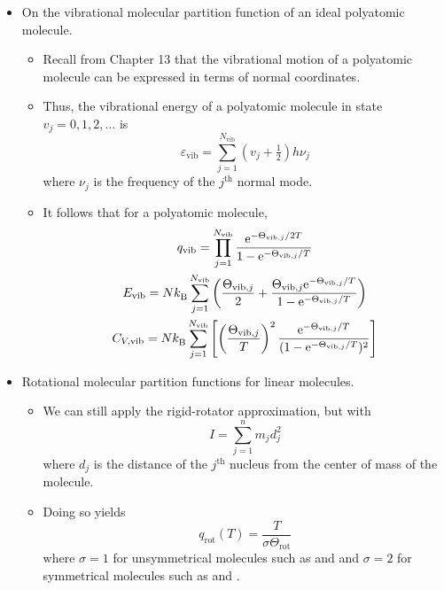 \documentclass[../notes.tex]{subfiles}
\begin{document}
\begin{itemize}
    \item On the vibrational molecular partition function of an ideal polyatomic molecule.
    \begin{itemize}
        \item Recall from Chapter 13 that the vibrational motion of a polyatomic molecule can be expressed in terms of normal coordinates.
        \item Thus, the vibrational energy of a polyatomic molecule in state $v_j=0,1,2,\dots$ is
        \begin{equation*}
            \varepsilon_\text{vib} = \sum_{j=1}^{N_\text{vib}}\left( v_j+\tfrac{1}{2} \right)h\nu_j
        \end{equation*}
        where $\nu_j$ is the frequency of the $j^\text{th}$ normal mode.
        \item It follows that for a polyatomic molecule,
        \begin{gather*}
            q_\text{vib} = \prod_{j=1}^{N_\text{vib}}\frac{\e[-\Theta_{\text{vib},j}/2T]}{1-\e[-\Theta_{\text{vib},j}/T]}\\
            E_\text{vib} = N\kB\sum_{j=1}^{N_\text{vib}}\left( \frac{\Theta_{\text{vib},j}}{2}+\frac{\Theta_{\text{vib},j}\e[-\Theta_{\text{vib},j}/T]}{1-\e[-\Theta_{\text{vib},j}/T]} \right)\\
            C_{V,\text{vib}} = N\kB\sum_{j=1}^{N_\text{vib}}\left[ \left( \frac{\Theta_{\text{vib},j}}{T} \right)^2\frac{\e[-\Theta_{\text{vib},j}/T]}{(1-\e[-\Theta_{\text{vib},j}/T])^2} \right]
        \end{gather*}
    \end{itemize}
    \item Rotational molecular partition functions for linear molecules.
    \begin{itemize}
        \item We can still apply the rigid-rotator approximation, but with
        \begin{equation*}
            I = \sum_{j=1}^nm_jd_j^2
        \end{equation*}
        where $d_j$ is the distance of the $j^\text{th}$ nucleus from the center of mass of the molecule.
        \item Doing so yields
        \begin{equation*}
            q_\text{rot}(T) = \frac{T}{\sigma\Theta_\text{rot}}
        \end{equation*}
        where $\sigma=1$ for unsymmetrical molecules such as  and  and $\sigma=2$ for symmetrical molecules such as  and .

\end{itemize}
\end{itemize}
\end{document}
